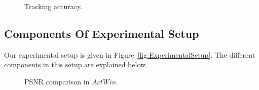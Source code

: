 \documentclass{article}
\begin{document}
\begin{itemize}
\begin{figure}
				\caption{Tracking accuracy.} 		
				
			\end{figure}



\subsection{Components Of Experimental Setup}
Our experimental setup is given in Figure~\ref{fig:ExperimentalSetup}.  The different components in this setup are explained below.


			\begin{figure}[t]
				\centering
				
					
				\caption{PSNR comparison in $ActWin$.} 		
				
			\end{figure}	


\end{itemize}
\end{document}
